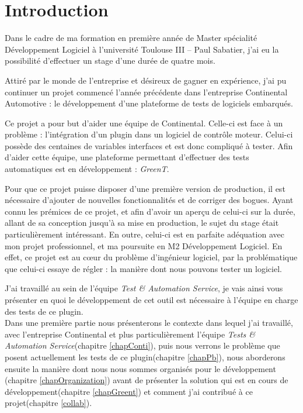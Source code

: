 \chapter*{Introduction}
Dans le cadre de ma formation en première année de Master spécialité Développement Logiciel à l'université Toulouse III – Paul Sabatier, j'ai eu la possibilité d'effectuer un stage d'une durée de quatre mois.

Attiré par le monde de l'entreprise et désireux de gagner en expérience, j'ai pu continuer un projet commencé l'année précédente dans l'entreprise Continental Automotive : le développement d'une plateforme de tests de logiciels embarqués.

Ce projet a pour but d'aider une équipe de Continental. Celle-ci est face à un problème : l'intégration d'un plugin dans un logiciel de contrôle moteur. Celui-ci possède des centaines de variables interfaces et est donc compliqué à tester. Afin d'aider cette équipe, une plateforme permettant d'effectuer des tests automatiques est en développement : \textit{GreenT}.

Pour que ce projet puisse disposer d'une première version de production, il est nécessaire d'ajouter de nouvelles fonctionnalités et de corriger des bogues. Ayant connu les prémices de ce projet, et afin d'avoir un aperçu de celui-ci sur la durée, allant de sa conception jusqu'à sa mise en production, le sujet du stage était particulièrement intéressant. En outre, celui-ci est en parfaite adéquation avec mon projet professionnel, et ma poursuite en M2 Développement Logiciel. En effet, ce projet est au cœur du problème d'ingénieur logiciel, par la problématique que celui-ci essaye de régler :  la manière dont nous pouvons tester un logiciel. 


J'ai travaillé au sein de l'équipe \textit{Test \& Automation Service}, je vais ainsi vous présenter en quoi le développement de cet outil est nécessaire à l'équipe en charge des tests de ce plugin.\\ Dans une première partie nous présenterons le contexte dans lequel j'ai travaillé, avec l'entreprise Continental et plus particulièrement l'équipe \textit{Tests \& Automation Service}(chapitre \ref{chapConti}), puis nous verrons le problème que posent actuellement les tests de ce plugin(chapitre \ref{chapPb}), nous aborderons ensuite la manière dont nous nous sommes organisés pour le développement (chapitre \ref{chapOrganization}) avant de présenter la solution qui est en cours de développement(chapitre \ref{chapGreent}) et comment j'ai contribué à ce projet(chapitre \ref{collab}). 

